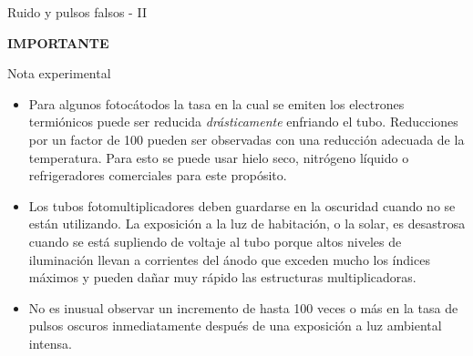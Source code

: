 \documentclass[a4paper,10pt]{beamer}
\begin{document}
\begin{frame}{Ruido y pulsos falsos - II}
 
 {\Large{\textbf{\color{red}IMPORTANTE}}}
 
 \begin{exampleblock}{Nota experimental}
    \begin{itemize}[<+->]
     \item \begin{justify}
            Para algunos fotocátodos la tasa en la cual se emiten los electrones termiónicos 
            puede ser reducida \emph{drásticamente} enfriando el tubo. Reducciones 
            por un factor de 100 pueden ser observadas con una reducción adecuada 
            de la temperatura. Para esto se puede usar hielo seco, nitrógeno líquido 
            o refrigeradores comerciales para este propósito.
           \end{justify}
     \item \begin{justify}
            Los tubos fotomultiplicadores deben guardarse en la oscuridad cuando no 
            se están utilizando. La exposición a la luz de habitación, o la solar, 
            es desastrosa cuando se está supliendo de voltaje al tubo porque altos 
            niveles de iluminación llevan a corrientes del ánodo que exceden mucho 
            los índices máximos y pueden dañar muy rápido las estructuras multiplicadoras.
           \end{justify}
     \item \begin{justify}
            No es inusual observar un incremento de hasta 100 veces o más en la tasa de 
            pulsos oscuros inmediatamente después de una exposición a luz ambiental 
            intensa.
           \end{justify}
    \end{itemize}

 \end{exampleblock}
\end{frame}
\end{document}
